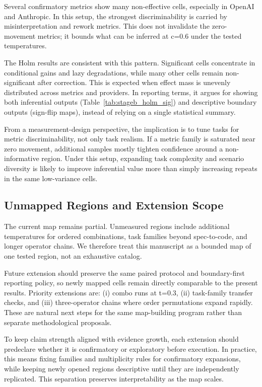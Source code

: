 \documentclass[11pt,a4paper]{article}
\begin{document}
Several confirmatory metrics show many non-effective cells, especially in OpenAI and Anthropic. In this setup, the strongest discriminability is carried by misinterpretation and rework metrics. This does not invalidate the zero-movement metrics; it bounds what can be inferred at c=0.6 under the tested temperatures.

The Holm results are consistent with this pattern. Significant cells concentrate in conditional gains and lazy degradations, while many other cells remain non-significant after correction. This is expected when effect mass is unevenly distributed across metrics and providers. In reporting terms, it argues for showing both inferential outputs (Table~\ref{tab:stageb_holm_sig}) and descriptive boundary outputs (sign-flip maps), instead of relying on a single statistical summary.

From a measurement-design perspective, the implication is to tune tasks for metric discriminability, not only task realism. If a metric family is saturated near zero movement, additional samples mostly tighten confidence around a non-informative region. Under this setup, expanding task complexity and scenario diversity is likely to improve inferential value more than simply increasing repeats in the same low-variance cells.

\subsection{Unmapped Regions and Extension Scope}

The current map remains partial. Unmeasured regions include additional temperatures for ordered combinations, task families beyond spec-to-code, and longer operator chains. We therefore treat this manuscript as a bounded map of one tested region, not an exhaustive catalog.

Future extension should preserve the same paired protocol and boundary-first reporting policy, so newly mapped cells remain directly comparable to the present results. Priority extensions are: (i) combo runs at t=0.3, (ii) task-family transfer checks, and (iii) three-operator chains where order permutations expand rapidly. These are natural next steps for the same map-building program rather than separate methodological proposals.

To keep claim strength aligned with evidence growth, each extension should predeclare whether it is confirmatory or exploratory before execution. In practice, this means fixing families and multiplicity rules for confirmatory expansions, while keeping newly opened regions descriptive until they are independently replicated. This separation preserves interpretability as the map scales.
\end{document}
